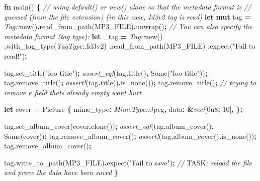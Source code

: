 \documentclass[
]{book}
\newenvironment{Shaded}{\begin{snugshade}}{\end{snugshade}}
\newcommand{\AlertTok}[1]{\textcolor[rgb]{0.94,0.16,0.16}{#1}}
\newcommand{\CommentTok}[1]{\textcolor[rgb]{0.56,0.35,0.01}{\textit{#1}}}
\newcommand{\ConstantTok}[1]{\textcolor[rgb]{0.00,0.00,0.00}{#1}}
\newcommand{\DecValTok}[1]{\textcolor[rgb]{0.00,0.00,0.81}{#1}}
\newcommand{\KeywordTok}[1]{\textcolor[rgb]{0.13,0.29,0.53}{\textbf{#1}}}
\newcommand{\NormalTok}[1]{#1}
\newcommand{\OperatorTok}[1]{\textcolor[rgb]{0.81,0.36,0.00}{\textbf{#1}}}
\newcommand{\PreprocessorTok}[1]{\textcolor[rgb]{0.56,0.35,0.01}{\textit{#1}}}
\newcommand{\StringTok}[1]{\textcolor[rgb]{0.31,0.60,0.02}{#1}}
\begin{document}
\begin{Shaded}
\begin{Highlighting}[]
\KeywordTok{fn}\NormalTok{ main() }\OperatorTok{\{}
    \CommentTok{// using \textasciigrave{}default()\textasciigrave{} or \textasciigrave{}new()\textasciigrave{} alone so that the metadata format is}
    \CommentTok{// guessed (from the file extension) (in this case, Id3v2 tag is read)}
    \KeywordTok{let} \KeywordTok{mut}\NormalTok{ tag }\OperatorTok{=} \PreprocessorTok{Tag::}\NormalTok{new()}\OperatorTok{.}\NormalTok{read\_from\_path(MP3\_FILE)}\OperatorTok{.}\NormalTok{unwrap()}\OperatorTok{;}
    \CommentTok{// You can also specify the metadata format (tag type):}
    \KeywordTok{let}\NormalTok{ \_tag }\OperatorTok{=} \PreprocessorTok{Tag::}\NormalTok{new()}
        \OperatorTok{.}\NormalTok{with\_tag\_type(}\PreprocessorTok{TagType::}\NormalTok{Id3v2)}
        \OperatorTok{.}\NormalTok{read\_from\_path(MP3\_FILE)}
        \OperatorTok{.}\NormalTok{expect(}\StringTok{"Fail to read!"}\NormalTok{)}\OperatorTok{;}

\NormalTok{    tag}\OperatorTok{.}\NormalTok{set\_title(}\StringTok{"foo title"}\NormalTok{)}\OperatorTok{;}
    \PreprocessorTok{assert\_eq!}\NormalTok{(tag}\OperatorTok{.}\NormalTok{title()}\OperatorTok{,} \ConstantTok{Some}\NormalTok{(}\StringTok{"foo title"}\NormalTok{))}\OperatorTok{;}
\NormalTok{    tag}\OperatorTok{.}\NormalTok{remove\_title()}\OperatorTok{;}
    \PreprocessorTok{assert!}\NormalTok{(tag}\OperatorTok{.}\NormalTok{title()}\OperatorTok{.}\NormalTok{is\_none())}\OperatorTok{;}
\NormalTok{    tag}\OperatorTok{.}\NormalTok{remove\_title()}\OperatorTok{;}
    \CommentTok{// trying to remove a field that\textquotesingle{}s already empty won\textquotesingle{}t hurt}

    \KeywordTok{let}\NormalTok{ cover }\OperatorTok{=}\NormalTok{ Picture }\OperatorTok{\{}
\NormalTok{        mime\_type}\OperatorTok{:} \PreprocessorTok{MimeType::}\NormalTok{Jpeg}\OperatorTok{,}
\NormalTok{        data}\OperatorTok{:} \OperatorTok{\&}\PreprocessorTok{vec!}\NormalTok{[}\DecValTok{0u8}\OperatorTok{;} \DecValTok{10}\NormalTok{]}\OperatorTok{,}
    \OperatorTok{\};}

\NormalTok{    tag}\OperatorTok{.}\NormalTok{set\_album\_cover(cover}\OperatorTok{.}\NormalTok{clone())}\OperatorTok{;}
    \PreprocessorTok{assert\_eq!}\NormalTok{(tag}\OperatorTok{.}\NormalTok{album\_cover()}\OperatorTok{,} \ConstantTok{Some}\NormalTok{(cover))}\OperatorTok{;}
\NormalTok{    tag}\OperatorTok{.}\NormalTok{remove\_album\_cover()}\OperatorTok{;}
    \PreprocessorTok{assert!}\NormalTok{(tag}\OperatorTok{.}\NormalTok{album\_cover()}\OperatorTok{.}\NormalTok{is\_none())}\OperatorTok{;}
\NormalTok{    tag}\OperatorTok{.}\NormalTok{remove\_album\_cover()}\OperatorTok{;}

\NormalTok{    tag}\OperatorTok{.}\NormalTok{write\_to\_path(MP3\_FILE)}\OperatorTok{.}\NormalTok{expect(}\StringTok{"Fail to save"}\NormalTok{)}\OperatorTok{;}
    \CommentTok{// }\AlertTok{TASK}\CommentTok{: reload the file and prove the data have been saved}
\OperatorTok{\}}
\end{Highlighting}
\end{Shaded}
\end{document}
